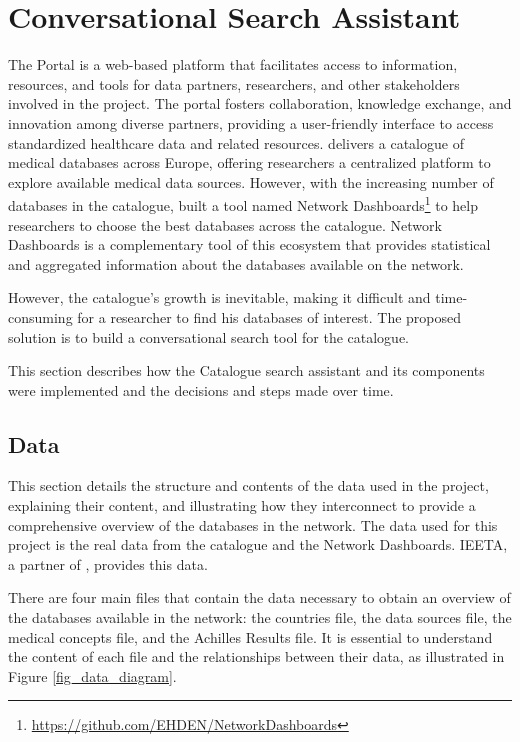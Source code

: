 \chapter{Conversational Search Assistant}
\label{chapter:CSA}


The {\ehden} Portal is a web-based platform that facilitates access to information, resources, and tools for data partners, researchers, and other stakeholders involved in the {\ehden} project. The portal fosters collaboration, knowledge exchange, and innovation among diverse partners, providing a user-friendly interface to access standardized healthcare data and related resources. {\ehden} delivers a catalogue of medical databases across Europe, offering researchers a centralized platform to explore available medical data sources. However, with the increasing number of databases in the catalogue, {\ehden} built a tool named Network Dashboards\footnote{\url{https://github.com/EHDEN/NetworkDashboards}} to help researchers to choose the best databases across the catalogue. {\ehden} Network Dashboards is a complementary tool of this ecosystem that provides statistical and aggregated information about the databases available on the network. 

However, the catalogue's growth is inevitable, making it difficult and time-consuming for a researcher to find his databases of interest. The proposed solution is to build a conversational search tool for the {\ehden} catalogue.

This section describes how the {\ehden} Catalogue search assistant and its components were implemented and the decisions and steps made over time.

\section{Data}
\label{data}

This section details the structure and contents of the data used in the project, explaining their content, and illustrating how they interconnect to provide a comprehensive overview of the databases in the {\ehden} network. The data used for this project is the real {\ehden} data from the catalogue and the Network Dashboards. IEETA, a partner of {\ehden}, provides this data.

There are four main files that contain the data necessary to obtain an overview of the databases available in the {\ehden} network: the countries file, the data sources file, the medical concepts file, and the Achilles Results file. It is essential to understand the content of each file and the relationships between their data, as illustrated in Figure \ref{fig_data_diagram}.

